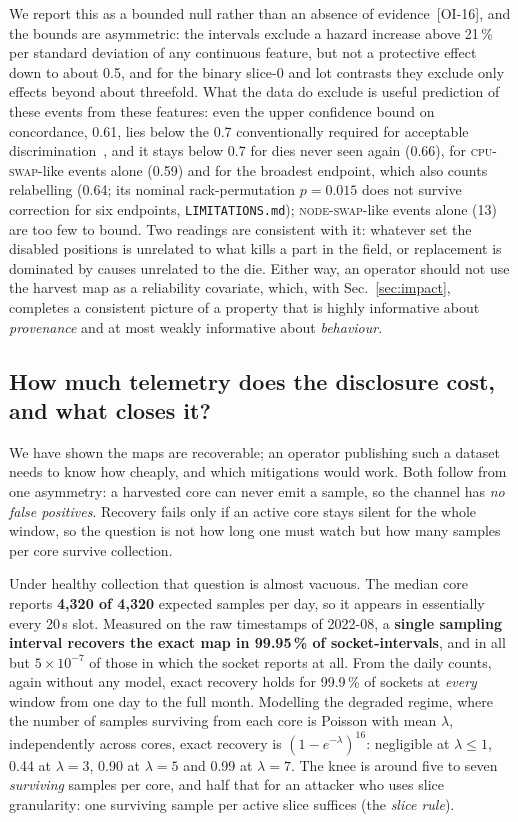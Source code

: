 \documentclass[10pt,conference]{IEEEtran}
\begin{document}
We report this as a bounded null rather than an absence of evidence~[OI-16], and the bounds are
asymmetric: the intervals exclude a hazard increase above 21\,\% per standard deviation of any
continuous feature, but not a protective effect down to about 0.5, and for the binary slice-0 and
lot contrasts they exclude only effects beyond about threefold. What the data do exclude is useful
prediction of these events from these features: even the upper confidence bound on concordance,
0.61, lies below the 0.7 conventionally required for acceptable
discrimination~\cite{hosmer2013applied}, and it stays below 0.7 for dies never seen again (0.66), for
\textsc{cpu-swap}-like events alone (0.59) and for the broadest endpoint, which also counts
relabelling (0.64; its nominal rack-permutation $p=0.015$ does not survive correction for six
endpoints, \texttt{LIMITATIONS.md}); \textsc{node-swap}-like events alone (13) are too few to bound. Two readings are consistent with it: whatever set the disabled positions
is unrelated to what kills a part in the field, or replacement is dominated by causes
unrelated to the die. Either way, an operator should not use the harvest map as a
reliability covariate, which, with Sec.~\ref{sec:impact}, completes a consistent picture of a
property that is highly informative about \emph{provenance} and at most weakly informative about
\emph{behaviour}.

\subsection{How much telemetry does the disclosure cost, and what closes it?}
\label{sec:channel}
We have shown the maps are recoverable; an operator publishing such a dataset needs to know how
cheaply, and which mitigations would work. Both follow from one asymmetry: a harvested core can
never emit a sample, so the channel has \emph{no false positives}. Recovery fails only if an
active core stays silent for the whole window, so the question is not how long one must watch but
how many samples per core survive collection.

Under healthy collection that question is almost vacuous. The median core reports
\textbf{4{,}320 of 4{,}320} expected samples per day, so it appears in essentially every 20\,s
slot. Measured on the raw timestamps of 2022-08, a \textbf{single sampling interval recovers the
exact map in 99.95\,\% of socket-intervals}, and in all but $5\times10^{-7}$ of those in which the
socket reports at all.
From the daily counts, again without any model, exact recovery holds for 99.9\,\% of sockets at
\emph{every} window from one day to the full month. Modelling the degraded regime, where the
number of samples surviving from each core is Poisson with mean $\lambda$, independently across
cores, exact recovery is $(1-e^{-\lambda})^{16}$: negligible
at $\lambda\le1$, 0.44 at $\lambda=3$, 0.90 at $\lambda=5$ and 0.99 at $\lambda=7$. The knee is
around five to seven \emph{surviving} samples per core, and half that for an attacker who uses
slice granularity: one surviving sample per active slice suffices (the \emph{slice rule}).
\end{document}
